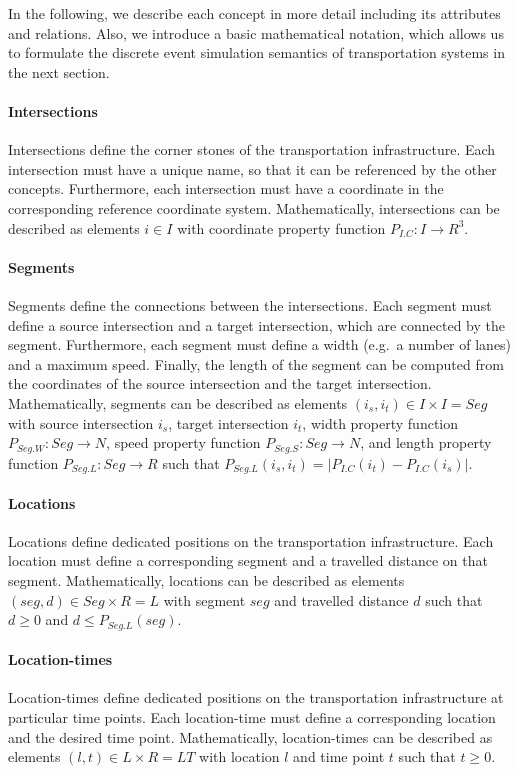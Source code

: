 \documentclass{article}
\begin{document}
    In the following, we describe each concept in more detail including its attributes and relations.
    Also, we introduce a basic mathematical notation, which allows us to formulate the discrete event simulation semantics of transportation systems in the next section.

    \paragraph{Intersections}
    Intersections define the corner stones of the transportation infrastructure.
    Each intersection must have a unique name, so that it can be referenced by the other concepts.
    Furthermore, each intersection must have a coordinate in the corresponding reference coordinate system.
    Mathematically, intersections can be described as elements $i \in I$ with coordinate property function $P_{I.C}: I \rightarrow R^3$.

    \paragraph{Segments}
    Segments define the connections between the intersections.
    Each segment must define a source intersection and a target intersection, which are connected by the segment.
    Furthermore, each segment must define a width (e.g.\ a number of lanes) and a maximum speed.
    Finally, the length of the segment can be computed from the coordinates of the source intersection and the target intersection.
    Mathematically, segments can be described as elements $(i_s, i_t) \in I \times I = Seg$ with source intersection $i_s$, target intersection $i_t$, width property function $P_{Seg.W}: Seg \rightarrow N$, speed property function $P_{Seg.S}: Seg \rightarrow N$, and length property function $P_{Seg.L}: Seg \rightarrow R$ such that $P_{Seg.L}(i_s, i_t) = |P_{I.C}(i_t) - P_{I.C}(i_s)|$.

    \paragraph{Locations}
    Locations define dedicated positions on the transportation infrastructure.
    Each location must define a corresponding segment and a travelled distance on that segment.
    Mathematically, locations can be described as elements $(seg, d) \in Seg \times R = L$ with segment $seg$ and travelled distance $d$ such that $d \geq 0$ and $d \leq P_{Seg.L}(seg)$.

    \paragraph{Location-times}
    Location-times define dedicated positions on the transportation infrastructure at particular time points.
    Each location-time must define a corresponding location and the desired time point.
    Mathematically, location-times can be described as elements $(l, t) \in L \times R = LT$ with location $l$ and time point $t$ such that $t \geq 0$.
\end{document}
